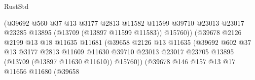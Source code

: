 \begin{lexlean}{RustStd}
\begin{coremodule}
                                            (@39692
                                              @560
                                              @37
                                              @13
                                              @3177
                                              @2813
                                              @11582
                                              @11599
                                              @39710
                                              @23013
                                              @23017
                                              @23285
                                              @13895
                                              (@13709 (@13897 @11599 @11583))
                                              @15760))
                                          (@39678
                                            @2126
                                            @2199
                                            @13
                                            @18
                                            @11635
                                            @11681
                                            (@39658
                                              @2126
                                              @13
                                              @11635
                                              (@39692
                                                @602
                                                @37
                                                @13
                                                @3177
                                                @2813
                                                @11609
                                                @11630
                                                @39710
                                                @23013
                                                @23017
                                                @23705
                                                @13895
                                                (@13709 (@13897 @11630 @11610))
                                                @15760))
                                            (@39678
                                              @146
                                              @157
                                              @13
                                              @17
                                              @11656
                                              @11680
                                              (@39658

\end{coremodule}
\end{lexlean}

